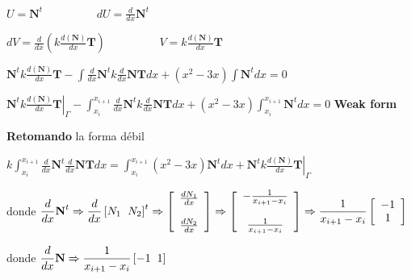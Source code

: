 \documentclass[12pt]{report}
\begin{document}
        $\displaystyle U=\textbf{N}^t \hspace{2cm} dU=\frac{d}{dx}\textbf{N}^t$
            
        $\displaystyle dV=\frac{d}{dx} \left( k\frac{d(\textbf{N})}{dx} \textbf{T}\right) \hspace{2cm} V=k\frac{d(\textbf{N})}{dx}\textbf{T}$

        \begin{center}
            $\displaystyle \textbf{N}^t  k \frac{d(\textbf{N})}{dx} \textbf{T} - \int \frac{d}{dx}\textbf{N}^t k \frac{d}{dx}\textbf{NT} dx + (x^2 -3x) \int \textbf{N}^t dx = 0$

            $\displaystyle \left. \textbf{N}^t  k \frac{d(\textbf{N})}{dx} \textbf{T} \right|_{\Gamma} - \int_{x_i}^{x_{i+1}} \frac{d}{dx}\textbf{N}^t k \frac{d}{dx}\textbf{NT} dx + (x^2 -3x) \int_{x_i}^{x_{i+1}} \textbf{N}^t dx = 0$  \hspace{1cm} \textbf{Weak form} 
        \end{center}

        \textbf{Retomando} la forma débil
        \begin{center}
            $\displaystyle k \int_{x_i}^{x_{i+1}} \frac{d}{dx} \textbf{N}^t \frac{d}{dx} \textbf{NT} dx  =  \int_{x_i}^{x_{i+1}} (x^2 -3x) \textbf{N}^t dx + \left. \textbf{N}^t  k \frac{d(\textbf{N})}{dx} \textbf{T} \right|_{\Gamma}$ 
        \end{center}

        donde $\displaystyle \frac{d}{dx} \textbf{N}^t \Rightarrow \frac{d}{dx} \left[ N_1 \hspace{0.2cm} N_2\right]^t \Rightarrow \left[ \begin{array}{c} \frac{d N_1}{dx} \\ \\ \frac{d N_2}{dx} \end{array} \right] \Rightarrow \left[ \begin{array}{c} -\frac{1}{x_{i+1}-x_i} \\ \\ \frac{1}{x_{i+1}-x_i} \end{array} \right] \Rightarrow \frac{1}{x_{i+1}-x_i} \left[ \begin{array}{c} -1 \\ 1 \end{array} \right]$

        donde $\displaystyle \frac{d}{dx}\textbf{N} \Rightarrow \frac{1}{x_{i+1}-x_i} \left[ -1 \hspace{0.2cm} 1 \right]$
\end{document}
